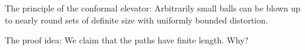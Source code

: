 The principle of the conformal elevator:
Arbitrarily small balls can be blown up to nearly round
sets of definite size with uniformly bounded distortion.

The proof idea: 
We claim that the paths have finite length. Why?
